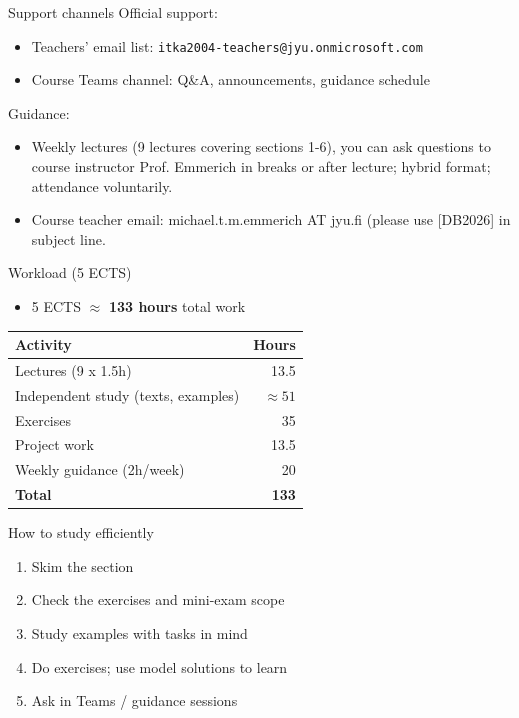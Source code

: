 \documentclass[10pt,aspectratio=169]{beamer}
\begin{document}
\begin{frame}{Support channels}
Official support:
\begin{itemize}
  \item Teachers' email list: \texttt{itka2004-teachers@jyu.onmicrosoft.com}
  \item Course Teams channel: Q\&A, announcements, guidance schedule
\end{itemize}

\vspace{0.5em}
Guidance:
\begin{itemize}
  \item Weekly lectures (9 lectures covering sections 1-6), you can ask questions to course instructor Prof. Emmerich in breaks or after lecture; hybrid format; attendance voluntarily.
  \item Course teacher email: michael.t.m.emmerich AT jyu.fi (please use [DB2026] in subject line.
\end{itemize}
\end{frame}

\begin{frame}{Workload (5 ECTS)}
\begin{itemize}
  \item 5 ECTS \(\approx\) \textbf{133 hours} total work
\end{itemize}

\begin{center}
\begin{tabular}{lr}
\toprule
\textbf{Activity} & \textbf{Hours} \\
\midrule
Lectures (9 x 1.5h) & 13.5 \\
Independent study (texts, examples) & \(\approx 51\) \\
Exercises & 35 \\
Project work & 13.5 \\
Weekly guidance (2h/week) & 20 \\
\midrule
\textbf{Total} & \textbf{133} \\
\bottomrule
\end{tabular}
\end{center}
\end{frame}

\begin{frame}{How to study efficiently}
\begin{enumerate}
  \item Skim the section
  \item Check the exercises and mini-exam scope
  \item Study examples with tasks in mind
  \item Do exercises; use model solutions to learn
  \item Ask in Teams / guidance sessions
\end{enumerate}
\end{frame}
\end{document}
